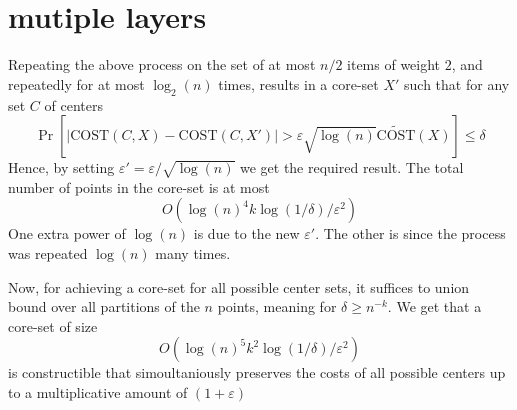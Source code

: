 \documentclass[11pt]{article}
\newcommand{\eps}{\varepsilon}
\newcommand{\cost}{\text{COST}}
\begin{document}
\section{mutiple layers}
Repeating the above process on the set of at most $n/2$ items of weight $2$, and repeatedly for at most $\log_2(n)$ times, results in a core-set $X'$ such that for any set $C$ of centers 
$$ \Pr[|\cost(C,X) - \cost(C,X')| > \eps \sqrt{\log(n)} \tilde{\cost}(X)] \leq \delta$$
Hence, by setting $\eps' = \eps /\sqrt{\log(n)}$ we get the required result. The total number of points in the core-set is at most 
$$O(\log(n)^4 k \log(1/\delta)/\eps^2)$$ 
One extra power of $\log(n)$ is due to the new $\eps'$. The other is since the process was repeated $\log(n)$ many times.

Now, for achieving a core-set for all possible center sets, it suffices to union bound over all partitions of the $n$ points, meaning for $\delta \geq n^{-k}$. We get that a core-set of size
$$O(\log(n)^5 k^2 \log(1/\delta)/\eps^2)$$ 
is constructible that simoultaniously preserves the costs of all possible centers up to a multiplicative amount of $(1+\eps)$



\end{document}
